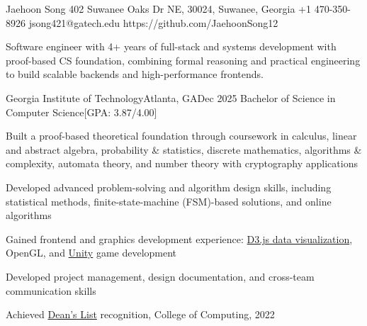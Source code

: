 % 
\begin{resume-header}{Jaehoon Song}
  {402 Suwanee Oaks Dr NE, 30024, Suwanee, Georgia}
  {+1 470-350-8926}
  {jsong421@gatech.edu}
  {https://github.com/JaehoonSong12}
\end{resume-header}
\begin{resume-objective}
Software engineer with 4+ years of full-stack and systems development  
with proof-based CS foundation, combining formal reasoning and practical 
engineering to build scalable backends and high-performance frontends.
\end{resume-objective}
\begin{resume-itemize}
  {Georgia Institute of Technology}{Atlanta, GA}{Dec 2025}
  {Bachelor of Science in Computer Science}[GPA: 3.87/4.00]
    \item Built a proof-based theoretical foundation through coursework in calculus, 
    linear and abstract algebra, probability \& statistics, discrete mathematics, 
    algorithms \& complexity, automata theory, and number theory with cryptography applications
    \item Developed advanced problem-solving and algorithm design skills, 
    including statistical methods, finite-state-machine (FSM)-based solutions, 
    and online algorithms
    \item Gained frontend and graphics development experience: 
    \href{https://jaehoonsong12.github.io/}{D3.js data visualization}, OpenGL, 
    and \href{https://github.com/YundaeLeeSong/ydjs-references/tree/main/project2409-game_shadowwalker}{Unity} 
    game development
    \item Developed project management, design documentation, and 
    cross-team communication skills
    \item Achieved \href{https://gatech.meritpages.com/stories/Jaehoon-Song-Named-to-Dean-s-List-at-Georgia-Tech-for-the-Summer-2022-Semester/104219189}{Dean's List} recognition, College of Computing, 2022
\end{resume-itemize}
